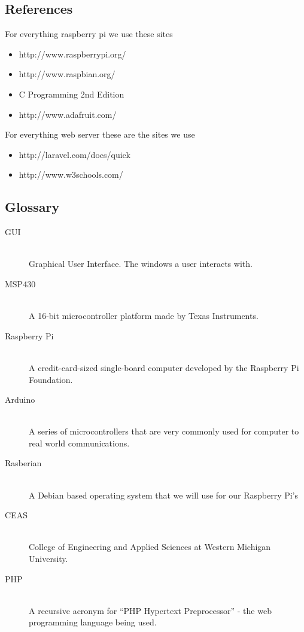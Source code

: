 \documentclass{report}
\begin{document}
\newpage
\subsection*{References}
For everything raspberry pi we use these sites
\begin{itemize}
\item http://www.raspberrypi.org/
\item http://www.raspbian.org/
\item C Programming 2nd Edition
\item http://www.adafruit.com/
\end{itemize}
For everything web server these are the sites we use
\begin{itemize}
\item http://laravel.com/docs/quick
\item http://www.w3schools.com/
\end{itemize}
\newpage
\subsection*{Glossary}
\begin{description}
\item [GUI] \hfill \\
Graphical User Interface. The windows a user interacts with.
\item [MSP430] \hfill \\
A 16-bit microcontroller platform made by Texas Instruments.
\item [Raspberry Pi] \hfill \\
 A credit-card-sized single-board computer developed by the Raspberry Pi Foundation.
\item [Arduino] \hfill \\
A series of microcontrollers that are very commonly used for computer to real world communications.
\item [Rasberian] \hfill \\
 A Debian based operating system that we will use for our Raspberry Pi’s
\item [CEAS] \hfill \\
College of Engineering and Applied Sciences at Western Michigan University.
\item [PHP] \hfill \\
A recursive acronym for “PHP Hypertext Preprocessor” - the web programming language being used.
\end{description}
\newpage
\end{document}
